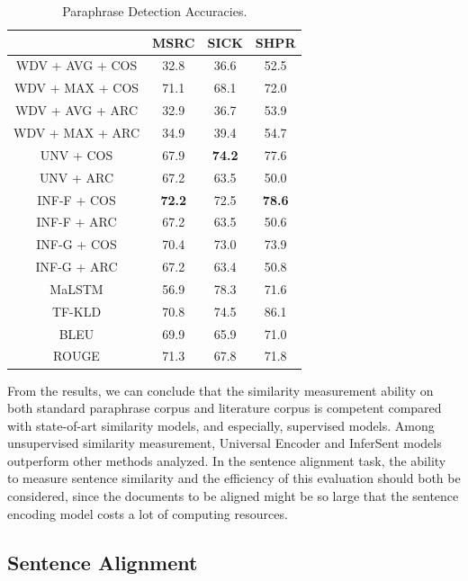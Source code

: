 \documentclass[runningheads]{llncs}
\begin{document}
\begin{table}[h!]\footnotesize
	\centering
	\small
	\caption{Paraphrase Detection Accuracies.}\label{tb:2}
	\begin{tabular}{|c|c|c|c|}
		\hline
		\diagbox{Method}{Accuracy (\%)}{Corpus} & MSRC & SICK & SHPR \\
		\hline
		\hline
		WDV + AVG + COS & 32.8 & 36.6 & 52.5 \\
		WDV + MAX + COS & 71.1 & 68.1 & 72.0 \\
		WDV + AVG + ARC & 32.9 & 36.7 & 53.9 \\
		WDV + MAX + ARC & 34.9 & 39.4 & 54.7 \\
		UNV + COS & 67.9 & \textbf{74.2} & 77.6 \\
		UNV + ARC & 67.2 & 63.5 & 50.0 \\
		INF-F + COS & \textbf{72.2} & 72.5 & \textbf{78.6} \\
		INF-F + ARC & 67.2 & 63.5 & 50.6 \\
		INF-G + COS & 70.4 & 73.0 & 73.9 \\
		INF-G + ARC & 67.2 & 63.4 & 50.8 \\
		\hline
		MaLSTM & 56.9 & 78.3 & 71.6 \\
		TF-KLD & 70.8 & 74.5 & 86.1 \\
		\hline
		BLEU & 69.9 & 65.9 & 71.0 \\
		ROUGE & 71.3 & 67.8 & 71.8 \\
		\hline
	\end{tabular}
\end{table}

From the results, we can conclude that the similarity measurement ability on both standard paraphrase corpus and literature corpus is competent compared with state-of-art similarity models, and especially, supervised models. Among unsupervised similarity measurement, Universal Encoder and InferSent models outperform other methods analyzed. In the sentence alignment task, the ability to measure sentence similarity and the efficiency of this evaluation should both be considered, since the documents to be aligned might be so large that the sentence encoding model costs a lot of computing resources.

\subsection{Sentence Alignment}
\end{document}
